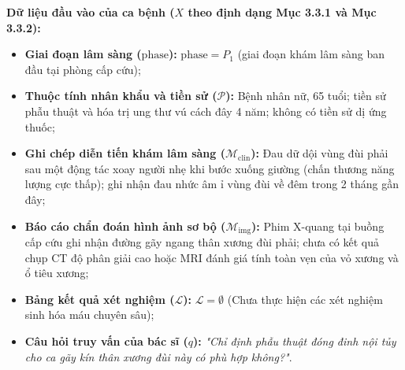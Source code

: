 \textbf{Dữ liệu đầu vào của ca bệnh ($X$ theo định dạng Mục 3.3.1 và Mục 3.3.2):}
\begin{itemize}
    \item \textbf{Giai đoạn lâm sàng ($\mathrm{phase}$):} $\mathrm{phase} = P_1$ (giai đoạn khám lâm sàng ban đầu tại phòng cấp cứu);
    \item \textbf{Thuộc tính nhân khẩu và tiền sử ($\mathcal{P}$):} Bệnh nhân nữ, 65 tuổi; tiền sử phẫu thuật và hóa trị ung thư vú cách đây 4 năm; không có tiền sử dị ứng thuốc;
    \item \textbf{Ghi chép diễn tiến khám lâm sàng ($\mathcal{M}_{\mathrm{clin}}$):} Đau dữ dội vùng đùi phải sau một động tác xoay người nhẹ khi bước xuống giường (chấn thương năng lượng cực thấp); ghi nhận đau nhức âm ỉ vùng đùi về đêm trong 2 tháng gần đây;
    \item \textbf{Báo cáo chẩn đoán hình ảnh sơ bộ ($\mathcal{M}_{\mathrm{img}}$):} Phim X-quang tại buồng cấp cứu ghi nhận đường gãy ngang thân xương đùi phải; chưa có kết quả chụp CT độ phân giải cao hoặc MRI đánh giá tính toàn vẹn của vỏ xương và ổ tiêu xương;
    \item \textbf{Bảng kết quả xét nghiệm ($\mathcal{L}$):} $\mathcal{L} = \emptyset$ (Chưa thực hiện các xét nghiệm sinh hóa máu chuyên sâu);
    \item \textbf{Câu hỏi truy vấn của bác sĩ ($q$):} \textit{"Chỉ định phẫu thuật đóng đinh nội tủy cho ca gãy kín thân xương đùi này có phù hợp không?"}.
\end{itemize}

